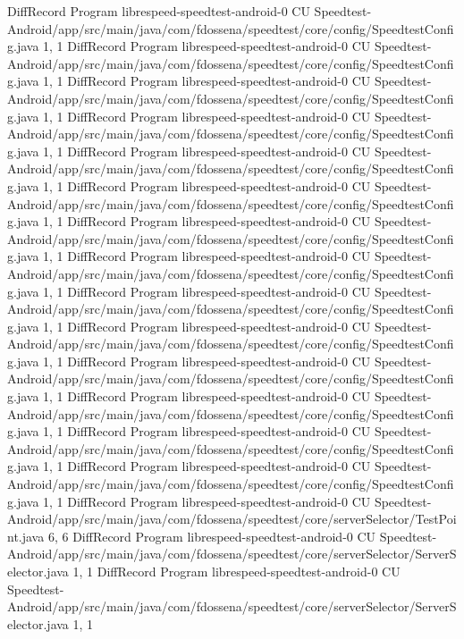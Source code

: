 DiffRecord Program librespeed-speedtest-android-0 CU Speedtest-Android/app/src/main/java/com/fdossena/speedtest/core/config/SpeedtestConfig.java  {1, 1}
DiffRecord Program librespeed-speedtest-android-0 CU Speedtest-Android/app/src/main/java/com/fdossena/speedtest/core/config/SpeedtestConfig.java  {1, 1}
DiffRecord Program librespeed-speedtest-android-0 CU Speedtest-Android/app/src/main/java/com/fdossena/speedtest/core/config/SpeedtestConfig.java  {1, 1}
DiffRecord Program librespeed-speedtest-android-0 CU Speedtest-Android/app/src/main/java/com/fdossena/speedtest/core/config/SpeedtestConfig.java  {1, 1}
DiffRecord Program librespeed-speedtest-android-0 CU Speedtest-Android/app/src/main/java/com/fdossena/speedtest/core/config/SpeedtestConfig.java  {1, 1}
DiffRecord Program librespeed-speedtest-android-0 CU Speedtest-Android/app/src/main/java/com/fdossena/speedtest/core/config/SpeedtestConfig.java  {1, 1}
DiffRecord Program librespeed-speedtest-android-0 CU Speedtest-Android/app/src/main/java/com/fdossena/speedtest/core/config/SpeedtestConfig.java  {1, 1}
DiffRecord Program librespeed-speedtest-android-0 CU Speedtest-Android/app/src/main/java/com/fdossena/speedtest/core/config/SpeedtestConfig.java  {1, 1}
DiffRecord Program librespeed-speedtest-android-0 CU Speedtest-Android/app/src/main/java/com/fdossena/speedtest/core/config/SpeedtestConfig.java  {1, 1}
DiffRecord Program librespeed-speedtest-android-0 CU Speedtest-Android/app/src/main/java/com/fdossena/speedtest/core/config/SpeedtestConfig.java  {1, 1}
DiffRecord Program librespeed-speedtest-android-0 CU Speedtest-Android/app/src/main/java/com/fdossena/speedtest/core/config/SpeedtestConfig.java  {1, 1}
DiffRecord Program librespeed-speedtest-android-0 CU Speedtest-Android/app/src/main/java/com/fdossena/speedtest/core/config/SpeedtestConfig.java  {1, 1}
DiffRecord Program librespeed-speedtest-android-0 CU Speedtest-Android/app/src/main/java/com/fdossena/speedtest/core/config/SpeedtestConfig.java  {1, 1}
DiffRecord Program librespeed-speedtest-android-0 CU Speedtest-Android/app/src/main/java/com/fdossena/speedtest/core/config/SpeedtestConfig.java  {1, 1}
DiffRecord Program librespeed-speedtest-android-0 CU Speedtest-Android/app/src/main/java/com/fdossena/speedtest/core/serverSelector/TestPoint.java  {6, 6}
DiffRecord Program librespeed-speedtest-android-0 CU Speedtest-Android/app/src/main/java/com/fdossena/speedtest/core/serverSelector/ServerSelector.java  {1, 1}
DiffRecord Program librespeed-speedtest-android-0 CU Speedtest-Android/app/src/main/java/com/fdossena/speedtest/core/serverSelector/ServerSelector.java  {1, 1}
